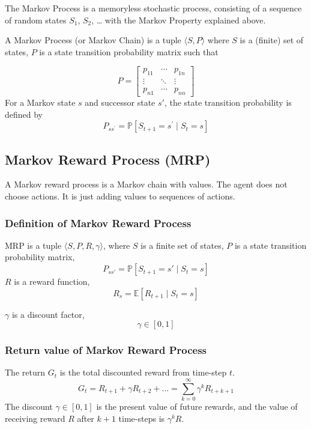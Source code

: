 \documentclass{article} %
\begin{document}
The Markov Process is a memoryless stochastic process, consisting of a sequence of random states $S_1$, $S_2$, … with the Markov Property explained above. 

A Markov Process (or Markov Chain) is a tuple \(\langle S, P\rangle\) where 
  \(S\) is a (finite) set of states, 
  \(P\) is a state transition probability matrix
such that 

\[P = 
\begin{bmatrix}
p_{11} & \cdots & p_{1n} \\
\vdots & \ddots & \vdots \\
p_{n1} & \cdots & p_{nn}
\end{bmatrix}
\]
For a Markov state \( s \) and successor state \( s' \), the state transition probability is defined by
\[{P}_{s s^{\prime}}=\mathbb{P}\left[S_{t+1}=s^{\prime} \mid S_{t}=s\right]\]



\subsection{Markov Reward Process (MRP)}
A Markov reward process is a Markov chain with values. The agent does not choose actions. It is just adding values to sequences of actions. 

\subsubsection{Definition of Markov Reward Process}
MRP is a tuple \(\langle S, P, R, \gamma \rangle\), where
\(S\) is a finite set of states, \(P\) is a state transition probability matrix,
    \[
    P_{ss'} = \mathbb{P}[S_{t+1} = s' \mid S_t = s]
    \]
  \(R\) is a reward function,
    \[
    R_s = \mathbb{E}[R_{t+1} \mid S_t = s]
    \]
    
   \(\gamma\) is a discount factor,
    \[
    \gamma \in [0, 1]
    \]

\subsubsection{Return value of Markov Reward Process}
The return \( G_t \) is the total discounted reward from time-step \( t \).
\[
G_t = R_{t+1} + \gamma R_{t+2} + \ldots = \sum_{k=0}^\infty \gamma^k R_{t+k+1}
\]
The discount \( \gamma \in [0, 1] \) is the present value of future rewards, and the value of receiving reward \( R \) after \( k + 1 \) time-steps is \( \gamma^k R \).
\end{document}
